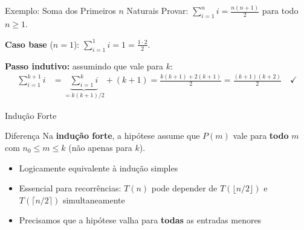 \documentclass[aspectratio=169]{beamer}
\newcommand{\impt}[1]{\textcolor{maccent}{\textbf{#1}}}
\begin{document}

\begin{frame}{Exemplo: Soma dos Primeiros $n$ Naturais}
Provar: $\displaystyle\sum_{i=1}^{n} i = \frac{n(n+1)}{2}$ para todo $n \geq 1$.

\vspace{0.3cm}
\pause

\textbf{Caso base} ($n=1$): $\sum_{i=1}^{1} i = 1 = \frac{1 \cdot 2}{2}$. \checkmark

\vspace{0.2cm}
\pause

\textbf{Passo indutivo:} assumindo que vale para $k$:
\begin{align*}
\sum_{i=1}^{k+1} i &= \underbrace{\sum_{i=1}^{k} i}_{= k(k+1)/2} + (k+1)
= \frac{k(k+1) + 2(k+1)}{2}
= \frac{(k+1)(k+2)}{2} \quad\checkmark
\end{align*}
\end{frame}


\begin{frame}{Indução Forte}
\begin{block}{Diferença}
Na \textbf{indução forte}, a hipótese assume que $P(m)$ vale para \impt{todo} $m$ com $n_0 \leq m \leq k$ (não apenas para $k$).
\end{block}

\vspace{0.3cm}
\pause

\begin{itemize}
    \item Logicamente equivalente à indução simples
    \pause
    \item Essencial para recorrências: $T(n)$ pode depender de $T(\lfloor n/2 \rfloor)$ e $T(\lceil n/2 \rceil)$ simultaneamente
    \pause
    \item Precisamos que a hipótese valha para \impt{todas} as entradas menores
\end{itemize}
\end{frame}

\end{document}
